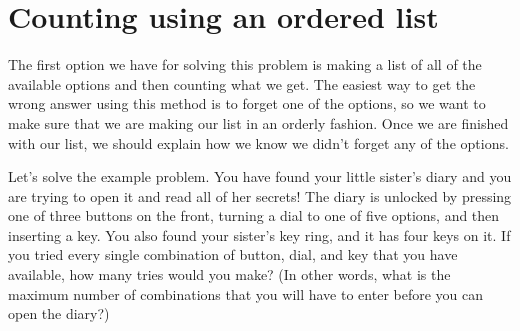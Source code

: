 \documentclass{ximera}
\begin{document}
\section{Counting using an ordered list}
The first option we have for solving this problem is making a list of all of the available options and then counting what we get. The easiest way to get the wrong answer using this method is to forget one of the options, so we want to make sure that we are making our list in an orderly fashion. Once we are finished with our list, we should explain how we know we didn't forget any of the options.
\begin{example}
Let's solve the example problem. You have found your little sister's diary and you are trying to open it and read all of her secrets! The diary is unlocked by pressing one of three buttons on the front, turning a dial to one of five options, and then inserting a key. You also found your sister's key ring, and it has four keys on it. If you tried every single combination of button, dial, and key that you have available, how many tries would you make? (In other words, what is the maximum number of combinations that you will have to enter before you can open the diary?)


\end{example}
\end{document}
